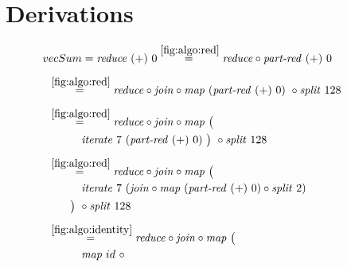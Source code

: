 
\chapter{Derivations}
\label{chapter:derivations}

\begin{figure*}[t]
\begin{align*}
  &\hspace{-1.5em}vecSum = \reduce\ (+)\ 0
%
  \overset{\ref{fig:algo:red}}{=\hspace{.2em}}
      \reduce \circ \partRed\ (+)\ 0\\[.5em]
%
  &\hspace{-2em}\quad\begin{aligned}
    &\overset{\ref{fig:algo:red}}{=\hspace{.2em}}
      \reduce \circ \join \circ \map\ (\partRed\ (+)\ 0)\ \circ \splitN\ 128
  \end{aligned}\\[.5em]
%
  &\hspace{-2em}\quad\begin{aligned}
    &\overset{\ref{fig:algo:red}}{=\hspace{.2em}}
      \reduce \circ \join \circ \map\ \big(\\
    &\qquad\quad\iterateN\ 7\ (\partRed\ (+)\ 0)\ \big)\ \circ \splitN\ 128
  \end{aligned}\\[.5em]
%
  &\hspace{-2em}\quad\begin{aligned}
    &\overset{\ref{fig:algo:red}}{=\hspace{.2em}}
      \reduce \circ \join \circ \map\ \big(\\
    &\qquad\quad\iterateN\ 7\ (\join \circ \map\ (\partRed\ (+)\ 0) \circ \splitN\ 2)\\
    &\qquad\big)\ \circ \splitN\ 128
  \end{aligned}\\[.5em]
%
  &\hspace{-2em}\quad\begin{aligned}
    &\overset{\ref{fig:algo:identity}}{=\hspace{.2em}}
      \reduce \circ \join \circ \map\ \big(\\
    &\qquad\quad\map\ id\ \circ \\

\end{aligned}
\end{align*}
\end{figure*}
